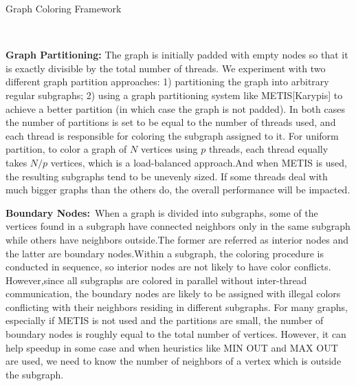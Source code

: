 \documentclass[preprint]{sigplanconf}
\begin{document}
\begin{algorithm}
\caption{Graph Coloring Framework \label{alg:framework}}
\begin{algorithmic}
\newline
	
		\newline
	\ENDWHILE
	

		
\end{algorithmic}\
\end{algorithm}

\textbf{Graph Partitioning:}
The graph is initially padded with empty nodes so that it is exactly divisible by the total number of threads. We experiment with two different graph partition approaches: 1) partitioning the graph into arbitrary regular subgraphs; 2) using a graph partitioning system like METIS[Karypis] to achieve a better partition (in which case the graph is not padded). In both cases the number of partitions is set to be equal to the number of threads used, and each thread is responsible for coloring the subgraph assigned to it. 
For uniform partition, to color a graph of $N$ vertices using $p$ threads, each thread equally takes $N/p$ vertices, which is a load-balanced approach.And when METIS is used, the resulting subgraphs tend to be unevenly sized. If some threads deal with much bigger graphs than the others do, the overall performance will be impacted.


\textbf{Boundary Nodes:}\
When a graph is divided into subgraphs, some of the vertices found in a subgraph have connected neighbors only in the same subgraph while others have neighbors outside.The former are referred as interior nodes and the latter are boundary nodes.Within a subgraph, the coloring procedure is conducted in sequence, so interior nodes are not likely to have color conflicts. However,since all subgraphs are colored in parallel without inter-thread communication, the boundary nodes are likely to be assigned with illegal colors conflicting with their neighbors residing in different subgraphs.  
 For many graphs, especially if METIS is not used and the partitions are small, the number of boundary nodes is roughly equal to the total number of vertices. However, it can help speedup in some case and when heuristics like MIN OUT and MAX OUT are used, we need to know the number of neighbors of a vertex which is outside the subgraph.\\
\end{document}
